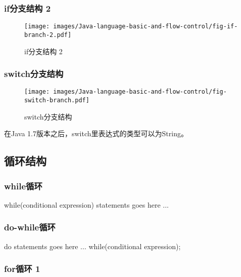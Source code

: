 \subsubsection{if分支结构 2}

\begin{figure}[htb]
\centering
\texttt{[image: images/Java-language-basic-and-flow-control/fig-if-branch-2.pdf]}
\caption{if分支结构 2}
\label{fig:if-branch-2}
\end{figure}

\subsubsection{switch分支结构}

\begin{figure}[htb]
\centering
\texttt{[image: images/Java-language-basic-and-flow-control/fig-switch-branch.pdf]}
\caption{switch分支结构}
\label{fig:switch-branch}
\end{figure}


在Java 1.7版本之后，switch里表达式的类型可以为String。

\subsection{循环结构}

\subsubsection{while循环}

\begin{javaCode}
  while(conditional expression) {
    statements goes here ...
  }
\end{javaCode}

\subsubsection{do-while循环}

\begin{javaCode}
  do {
    statements goes here ...
  }
  while(conditional expression);
\end{javaCode}

\subsubsection{for循环 1}

